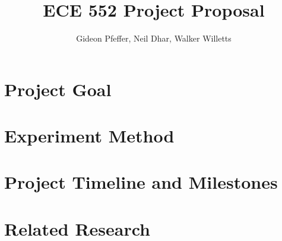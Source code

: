 \documentclass[letterpaper]{article}
\begin{document}
\title{ECE 552 Project Proposal}
\author{Gideon Pfeffer, Neil Dhar, Walker Willetts}
\date{}
\maketitle

\section{Project Goal}

\section{Experiment Method}

\section{Project Timeline and Milestones}

\section{Related Research}
\end{document}
